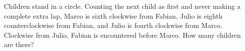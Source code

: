 Children stand in a circle. Counting the next child as first and never making a complete extra lap, Marco is sixth clockwise from Fabian, Julio is eighth counterclockwise from Fabian, and Julio is fourth clockwise from Marco. Clockwise from Julio, Fabian is encountered before Marco. How many children are there?
